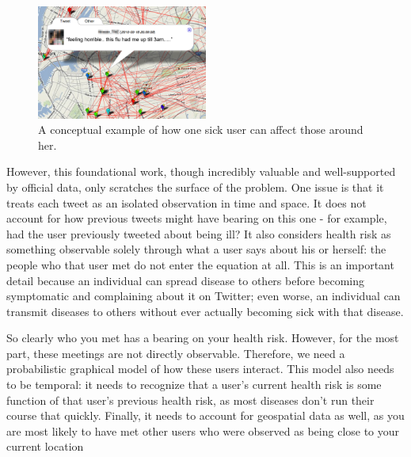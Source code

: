 \documentclass[11pt, letterpaper]{article}
\begin{document}
                \begin{figure}
                    \begin{center}
                        \includegraphics[width=0.5\textwidth]{meetings-example.png}
                        \caption{A conceptual example of how one sick user can affect those around her.}
                        \label{meetings-example}
                    \end{center}
                \end{figure}

                However, this foundational work, though incredibly valuable and well-supported by official data, only scratches the surface of the problem. One issue is that it treats each tweet as an isolated observation in time and space. It does not account for how previous tweets might have bearing on this one - for example, had the user previously tweeted about being ill? It also considers health risk as something observable solely through what a user says about his or herself: the people who that user met do not enter the equation at all. This is an important detail because an individual can spread disease to others before becoming symptomatic and complaining about it on Twitter; even worse, an individual can transmit diseases to others without ever actually becoming sick with that disease.

                So clearly who you met has a bearing on your health risk. However, for the most part, these meetings are not directly observable. Therefore, we need a probabilistic graphical model of how these users interact. This model also needs to be temporal: it needs to recognize that a user's current health risk is some function of that user's previous health risk, as most diseases don't run their course that quickly. Finally, it needs to account for geospatial data as well, as you are most likely to have met other users who were observed as being close to your current location
\end{document}
